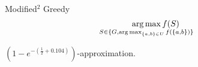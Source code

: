 \begin{frame}{Modified$^2$ Greedy}
    $$
    \argmax_{\mathclap{S \in \{G, \argmax_{\{a,b\} \in U}f(\{a, b\})\}}}f(S)
    $$

    \begin{theorem}
        $(1 - e^{-(\frac{1}{2} + 0.104)})$-approximation.
    \end{theorem}
\end{frame}